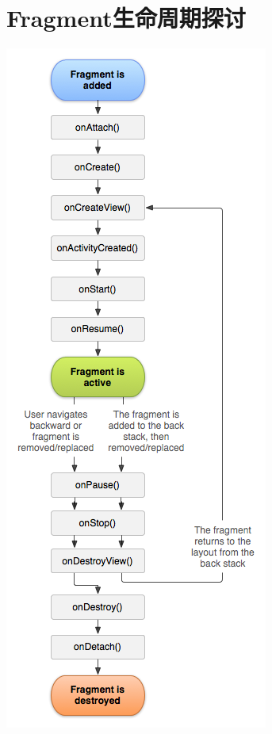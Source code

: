 \documentclass[9pt, b5paaper]{book}
\begin{document}
\chapter{Fragment生命周期探讨}
\label{sec-2}
\includegraphics[width=.9\linewidth]{./pic/fragmentlifecycle.png}
\end{document}
